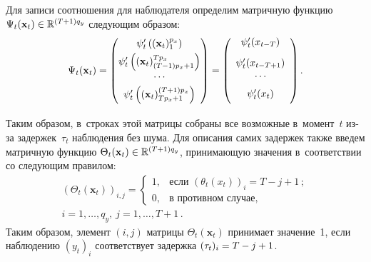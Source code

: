 \begin{multicols}{2}
     Для записи соотношения для наблюдателя определим мат\-рич\-ную 
функцию $\Psi_t(\mathbf{x}_t) \hm\in \mathbb{R}^{(T+1) %
q_y}$ сле\-ду\-ющим обра\-зом:
     $$
     \Psi_t(\mathbf{x}_t) =\begin{pmatrix}
     \psi_t^\prime \left( (\mathbf{x}_t)_1^{p_x}\right)\\[3pt]
     \psi_t^\prime \left( (\mathbf{x}_t)_{(T-1)p_x+1}^{Tp_x}\right)\\[3pt]
     \cdots\\[3pt]
     \psi_t^\prime \left( (\mathbf{x}_t)_{Tp_x+1}^{(T+1)p_x} \right)
     \end{pmatrix} = \left(
     \vphantom{\begin{pmatrix}
     \psi_t^\prime \left( (\mathbf{x}_t)_1^{p_x}\right)\\[3pt]
     \psi_t^\prime \left( (\mathbf{x}_t)_{(T-1)p_x+1}^{Tp_x}\right)\\[6pt]
     \cdots\\[3pt]
     \psi_t^\prime \left( (\mathbf{x}_t)_{Tp_x+1}^{(T+1)p_x} \right)
     \end{pmatrix}}
     \begin{array}{c}
     \\[-17pt]
     \psi_t^\prime (x_{t-T})\\[9pt]
     \psi_t^\prime (x_{t-T+1})\\[1pt]
     \cdots\\[6pt]
     \psi_t^\prime(x_t)
     \end{array}
     \right).
     $$
     
Таким образом, в~строках этой мат\-ри\-цы собраны все воз\-мож\-ные в~момент~$t$ 
из-за задержек~$\tau_t$ наблюдения без шума. Для описания 
самих задержек так\-же введем мат\-рич\-ную функцию $\Theta_t (\mathbf{x}_t) 
\hm\in \mathbb{R}^{(T+1)q_y%
}$, при\-ни\-ма\-ющую значения 
в~соответствии со сле\-ду\-ющим правилом:
     \begin{multline*}
     \left( \Theta_t(\mathbf{x}_t)\right)_{i,j} =\begin{cases} 
     1, & \mbox{если } \left( \theta_t(x_t)\right)_i=T-j+1\,;\\
     0, &\mbox{в\ противном\ случае},
     \end{cases}\\
     i=1,\ldots , q_y,\ j=1,\ldots , T+1\,.
     \end{multline*}
     Таким образом, элемент $(i,j)$ мат\-ри\-цы $\Theta_t(\mathbf{x}_t)$ 
принимает значение~1, если наблюдению $(y_t)_i$ соответствует за\-держ\-ка 
$(\tau_t)_i\hm= T\hm- j\hm+1$. 
     

\end{multicols}
